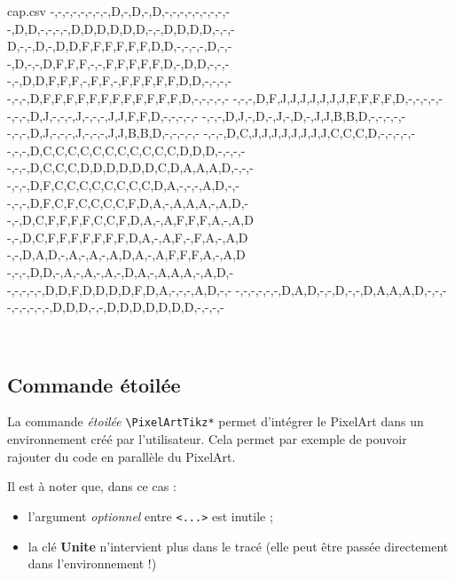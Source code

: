 \documentclass{article}
\newcommand\Cle[1]{{\bfseries\sffamily\textlangle #1\textrangle}}
\begin{document}
\begin{PresentationCode}{}

\begin{filecontents*}[overwrite]{cap.csv}
	-,-,-,-,-,-,-,-,D,-,D,-,D,-,-,-,-,-,-,-,-,-
	-,D,D,-,-,-,-,D,D,D,D,D,D,-,-,D,D,D,D,-,-,-
	D,-,-,D,-,D,D,F,F,F,F,F,F,D,D,-,-,-,-,D,-,-
	-,D,-,-,D,F,F,F,-,-,F,F,F,F,F,D,-,D,D,-,-,-
	-,-,D,D,F,F,F,-,F,F,-,F,F,F,F,F,D,D,-,-,-,-
	-,-,-,D,F,F,F,F,F,F,F,F,F,F,F,F,D,-,-,-,-,-
	-,-,-,D,F,J,J,J,J,J,J,J,F,F,F,F,D,-,-,-,-,-
	-,-,-,D,J,-,-,-,J,-,-,-,J,J,F,F,D,-,-,-,-,-
	-,-,-,D,J,-,D,-,J,-,D,-,J,J,B,B,D,-,-,-,-,-
	-,-,-,D,J,-,-,-,J,-,-,-,J,J,B,B,D,-,-,-,-,-
	-,-,-,D,C,J,J,J,J,J,J,J,J,C,C,C,D,-,-,-,-,-
	-,-,-,D,C,C,C,C,C,C,C,C,C,C,C,D,D,D,-,-,-,-
	-,-,-,D,C,C,C,D,D,D,D,D,D,C,D,A,A,A,D,-,-,-
	-,-,-,D,F,C,C,C,C,C,C,C,C,D,A,-,-,-,A,D,-,-
	-,-,-,D,F,C,F,C,C,C,C,F,D,A,-,A,A,A,-,A,D,-
	-,-,D,C,F,F,F,F,C,C,F,D,A,-,A,F,F,F,A,-,A,D
	-,-,D,C,F,F,F,F,F,F,F,D,A,-,A,F,-,F,A,-,A,D
	-,-,D,A,D,-,A,-,A,-,A,D,A,-,A,F,F,F,A,-,A,D
	-,-,-,D,D,-,A,-,A,-,A,-,D,A,-,A,A,A,-,A,D,-
	-,-,-,-,-,D,D,F,D,D,D,D,F,D,A,-,-,-,A,D,-,-
	-,-,-,-,-,-,D,A,D,-,-,D,-,-,D,A,A,A,D,-,-,-
	-,-,-,-,-,-,D,D,D,-,-,D,D,D,D,D,D,D,-,-,-,-
\end{filecontents*}

~~
\end{PresentationCode}

\pagebreak

\subsection{Commande étoilée}

La commande \textit{étoilée} \texttt{\textbackslash PixelArtTikz*} permet d'intégrer le PixelArt dans un environnement créé par l'utilisateur. Cela permet par exemple de pouvoir rajouter du code en parallèle du PixelArt.

\smallskip

Il est à noter que, dans ce cas :

\begin{itemize}
	\item l'argument \textit{optionnel} entre \texttt{<...>} est inutile ;
	\item la clé \Cle{Unite} n'intervient plus dans le tracé (elle peut être passée directement dans l'environnement !)
\end{itemize}
\end{document}
